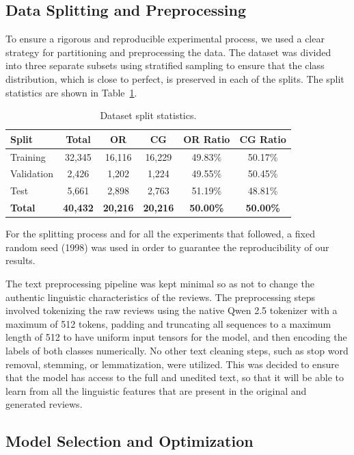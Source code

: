 \documentclass[utf8]{FrontiersinHarvard}
\begin{document}
\subsection{Data Splitting and Preprocessing}

To ensure a rigorous and reproducible experimental process, we used a clear strategy for partitioning and preprocessing the data. The dataset was divided into three separate subsets using stratified sampling to ensure that the class distribution, which is close to perfect, is preserved in each of the splits. The split statistics are shown in Table~\ref{tab:splits}.

\begin{table}[htbp]
\caption{Dataset split statistics.}\label{tab:splits}
\centering
\begin{tabular}{lccccc}
\toprule
\textbf{Split} & \textbf{Total} & \textbf{OR} & \textbf{CG} & \textbf{OR Ratio} & \textbf{CG Ratio} \\
\midrule
Training   & 32,345 & 16,116 & 16,229 & 49.83\% & 50.17\% \\
Validation &  2,426 &  1,202 &  1,224 & 49.55\% & 50.45\% \\
Test       &  5,661 &  2,898 &  2,763 & 51.19\% & 48.81\% \\
\midrule
\textbf{Total} & \textbf{40,432} & \textbf{20,216} & \textbf{20,216} & \textbf{50.00\%} & \textbf{50.00\%} \\
\bottomrule
\end{tabular}
\end{table}

For the splitting process and for all the experiments that followed, a fixed random seed (1998) was used in order to guarantee the reproducibility of our results.

The text preprocessing pipeline was kept minimal so as not to change the authentic linguistic characteristics of the reviews. The preprocessing steps involved tokenizing the raw reviews using the native Qwen 2.5 tokenizer with a maximum of 512 tokens, padding and truncating all sequences to a maximum length of 512 to have uniform input tensors for the model, and then encoding the labels of both classes numerically. No other text cleaning steps, such as stop word removal, stemming, or lemmatization, were utilized. This was decided to ensure that the model has access to the full and unedited text, so that it will be able to learn from all the linguistic features that are present in the original and generated reviews.

\subsection{Model Selection and Optimization}
\end{document}
